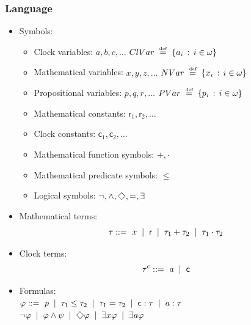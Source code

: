 \documentclass[xcolor=x11names]{beamer}
\renewcommand{\Diamond}{\scalebox{.9}{\raisebox{-.4ex}{\rotatebox{45}{$\Box$}}}}
\newcommand{\vonal} [1][.2]{\hspace{#1cm} | \hspace{#1cm}}
\newcommand{\defegy}[1][.1]{\hspace{#1cm}\overset{\textup{\tiny def}}{=}\hspace{#1cm}}
\begin{document}
\begin{frame}
	\frametitle{Language}
\footnotesize
\begin{itemize}
\item Symbols:
 \begin{itemize}
 \item Clock variables: $a, b, c,\dots $ \hfill $ClVar\defegy \{a_i \, : \, i\in \omega\}$
 \item Mathematical variables: $x, y, z, \dots$ \hfill $NVar\defegy \{x_i \, : \, i\in \omega\}$
 \item Propositional variables: $p, q, r, \dots$ \hfill $PVar\defegy \{p_i \, : \, i\in \omega\}$
 \item Mathematical constants: $\mathsf r_1, \mathsf r_2, \dots$
 \item Clock constants: $\mathsf c_1, \mathsf c_2, \dots$
 \item Mathematical function symbols: $+, \cdot$
 \item Mathematical predicate symbols: $\leq$
 \item Logical symbols: $\lnot, \land, \Diamond, =, \exists$
 \end{itemize}
\item Mathematical terms:
\[\tau ::=\, \,   x \vonal \mathsf r\vonal \tau_1 +\tau_2 \vonal \tau_1 \cdot \tau_2\]
\item Clock terms:
\[\tau^c ::=\, \,   a \vonal \mathsf c\]
\item Formulas:
\\
$\varphi ::=\, \,  p  \vonal \tau_1 \leq \tau_2 \vonal \tau_1 = \tau_2 \vonal \mathsf c : \tau \vonal a : \tau $
\\ \hfill $ \lnot \varphi \vonal \varphi\land \psi \vonal \Diamond \varphi \vonal \exists x \varphi\vonal \exists a \varphi $
\end{itemize}
\end{frame}
\end{document}
